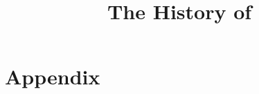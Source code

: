 \documentclass[a4paper,12pt,openany,oneside]{book}
\title{The History of \Miith}
\begin{document}
\stuffatthebeginning



\begin{comment}
\part{The Book Series of \Miith}
\end{comment}




\part{Appendix}
\appendix


\printindex
\end{document}
